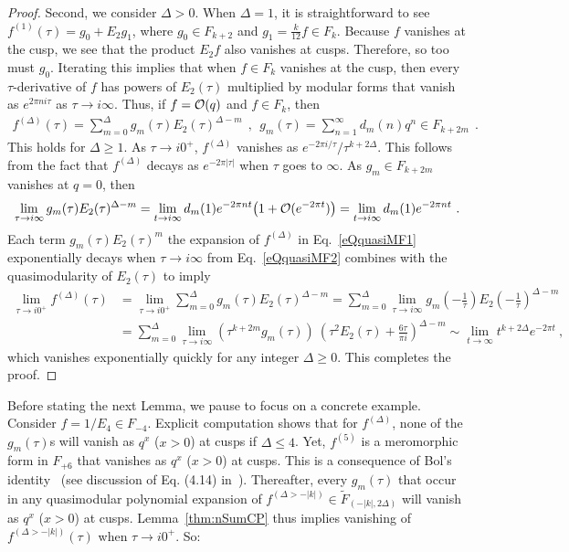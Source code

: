 \documentclass[11pt,a4paper]{article}
\begin{document}
\begin{proof}
Second, we consider $\Delta > 0$. When $\Delta = 1$, it is straightforward to see $f^{(1)}(\tau) = g_0 + E_2 g_1 $, where $g_0 \in F_{k+2}$ and $g_1 = \tfrac{k}{12} f \in F_k$. Because $f$ vanishes at the cusp, we see that the product $E_2 f$ also vanishes at cusps. Therefore, so too must $g_0$. Iterating this implies that when $f \in F_k$ vanishes at the cusp, then every $\tau$-derivative of $f$ has powers of $E_2(\tau)$ multiplied by modular forms that vanish as $e^{2 \pi n i \tau}$ as $\tau \to i \infty$. Thus, if $f = {\cal O}(q)$ and $f \in F_k$, then
\begin{align}
f^{(\Delta)}(\tau) = \sum_{m = 0}^{\Delta} g_m(\tau) E_2(\tau)^{\Delta-m} ~~,~~g_m(\tau) = \sum_{n = 1}^{\infty} d_m(n) q^n \in F_{k + 2m}~~. \label{eQquasiMF1}
\end{align}
This holds for $\Delta \geq 1$. As $\tau \to i 0^+$, $f^{(\Delta)}$ vanishes as $e^{-2\pi i/\tau}/\tau^{k+2\Delta}$. This 
follows from the fact that $f^{(\Delta)}$ decays as $e^{-2 \pi |\tau|}$ when $\tau$ goes to $\infty$. As $g_m \in F_{k + 2m}$ vanishes at $q = 0$, then 
\begin{align}
\lim_{\tau \to i \infty} g_m(\tau) E_2(\tau)^{\Delta-m} 
= \lim_{t \to i \infty} d_m(1) e^{-2 \pi n t} \big( 1 + {\cal O}(e^{-2\pi t}) \big) 
= \lim_{t \to i \infty} d_m(1) e^{-2 \pi n t}~. \label{eQquasiMF2}
\end{align}
Each term $g_m(\tau) E_2(\tau)^m$ the expansion of $f^{(\Delta)}$ in Eq.~\eqref{eQquasiMF1} exponentially decays when $\tau \to i \infty$ from Eq.~\eqref{eQquasiMF2} combines with the quasimodularity of $E_2(\tau)$ to imply
\begin{align}
\lim_{\tau \to i 0^+} f^{(\Delta)}(\tau) 
&= \lim_{\tau \to i 0^+} \sum_{m = 0}^{\Delta} g_m(\tau) E_2(\tau)^{\Delta-m} 
= \sum_{m = 0}^{\Delta}  \lim_{\tau \to i \infty} g_m\left(-\frac{1}{\tau}\right) E_2\left(-\frac{1}{\tau}\right)^{\Delta-m} \\
&= \sum_{m = 0}^{\Delta}  \lim_{\tau \to i \infty} \left( \tau^{k + 2m}g_m\left(\tau\right) \right) ~\left( \tau^2 E_2\left( \tau\right) + \frac{6 \tau}{\pi i} \right)^{\Delta-m} 
\sim \lim_{t \to \infty} t^{k + 2 \Delta} e^{-2 \pi t}~,\!\!\!\!
\end{align}
which vanishes exponentially quickly for any integer $\Delta \geq 0$. This completes the proof. \end{proof}

Before stating the next Lemma, we pause to focus on a concrete example. Consider $f = 1/E_4 \in F_{-4}$. Explicit computation shows that for $f^{(\Delta)}$, none of the $g_m(\tau)$s will vanish as $q^{x}$ ($x > 0$) at cusps if $\Delta \leq 4$. Yet, $f^{(5)}$ is a meromorphic form in $F_{+6}$ that vanishes as $q^{x}$ ($x > 0$) at cusps. This is a consequence of Bol's identity~\cite{26-Bol1} (see discussion of Eq. (4.14) in~\cite{27-Bol2}). Thereafter, every $g_m(\tau)$ that occur in any quasimodular polynomial expansion of $f^{(\Delta > -|k|)} \in \tilde{F}_{(-|k|,2 \Delta)}$ will vanish as $q^{x}$ ($x > 0$) at cusps. Lemma~\ref{thm:nSumCP} thus implies vanishing of $f^{(\Delta > -|k|)}(\tau)$ when $\tau \to i 0^+$. So:
\end{document}

